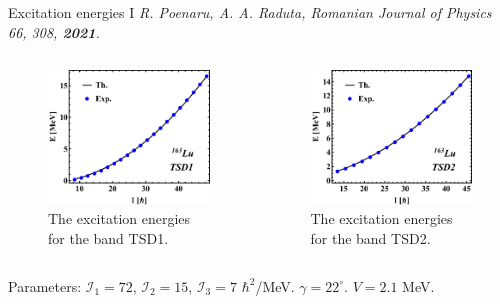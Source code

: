 \documentclass{beamer}
\begin{document}
\begin{frame}{Excitation energies I}
\small{\emph{R. Poenaru, A. A. Raduta, Romanian Journal of Physics 66, 308, \textbf{2021}.}}
\begin{columns} 
\begin{figure}
    \centering
    \includegraphics[scale=0.4]{figs/DoubleShift_TSD1.pdf}
    \caption{The excitation energies for the band TSD1.}
\end{figure}
\begin{figure}
    \centering
    \includegraphics[scale=0.4]{figs/DoubleShift_TSD2.pdf}
    \caption{The excitation energies for the band TSD2.}
\end{figure}
\end{columns}
Parameters: $\mathcal{I}_1=72$, $\mathcal{I}_2=15$, $\mathcal{I}_3=7$ $\hbar^2$/MeV. $\gamma=22^\circ$. $V=2.1$ MeV.
\end{frame}
\end{document}
